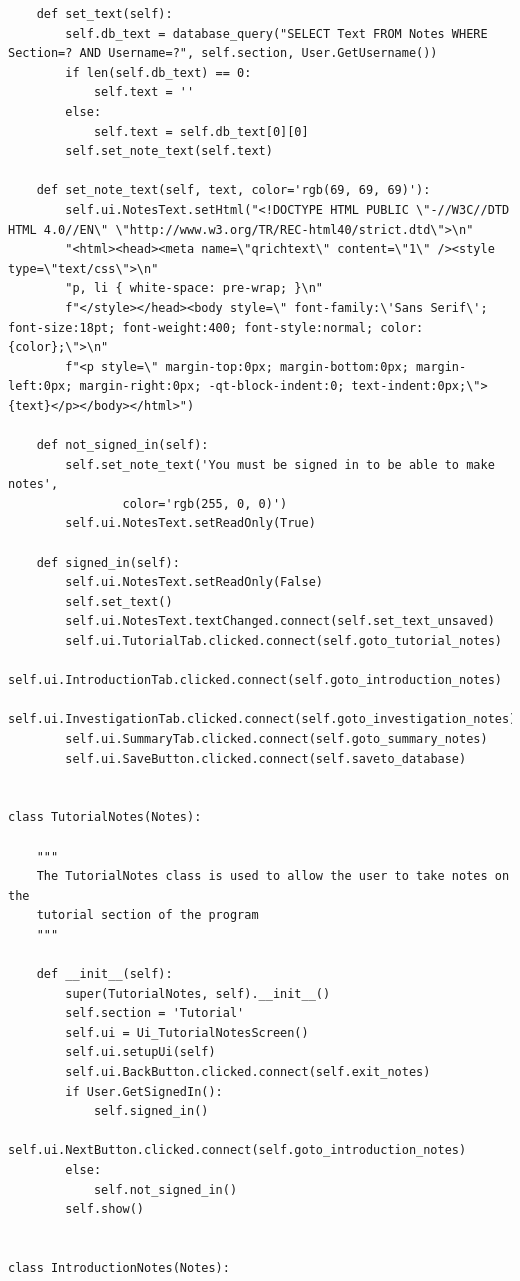 \documentclass{article}
\begin{document}
\begin{lstlisting}
    def set_text(self):
        self.db_text = database_query("SELECT Text FROM Notes WHERE Section=? AND Username=?", self.section, User.GetUsername())
        if len(self.db_text) == 0:
            self.text = ''
        else:
            self.text = self.db_text[0][0]
        self.set_note_text(self.text)

    def set_note_text(self, text, color='rgb(69, 69, 69)'):
        self.ui.NotesText.setHtml("<!DOCTYPE HTML PUBLIC \"-//W3C//DTD HTML 4.0//EN\" \"http://www.w3.org/TR/REC-html40/strict.dtd\">\n"
        "<html><head><meta name=\"qrichtext\" content=\"1\" /><style type=\"text/css\">\n"
        "p, li { white-space: pre-wrap; }\n"
        f"</style></head><body style=\" font-family:\'Sans Serif\'; font-size:18pt; font-weight:400; font-style:normal; color:{color};\">\n"
        f"<p style=\" margin-top:0px; margin-bottom:0px; margin-left:0px; margin-right:0px; -qt-block-indent:0; text-indent:0px;\">{text}</p></body></html>")

    def not_signed_in(self):
        self.set_note_text('You must be signed in to be able to make notes',
                color='rgb(255, 0, 0)')
        self.ui.NotesText.setReadOnly(True)

    def signed_in(self):
        self.ui.NotesText.setReadOnly(False)
        self.set_text()
        self.ui.NotesText.textChanged.connect(self.set_text_unsaved)
        self.ui.TutorialTab.clicked.connect(self.goto_tutorial_notes)
        self.ui.IntroductionTab.clicked.connect(self.goto_introduction_notes)
        self.ui.InvestigationTab.clicked.connect(self.goto_investigation_notes)
        self.ui.SummaryTab.clicked.connect(self.goto_summary_notes)
        self.ui.SaveButton.clicked.connect(self.saveto_database)


class TutorialNotes(Notes):

    """
    The TutorialNotes class is used to allow the user to take notes on the
    tutorial section of the program
    """

    def __init__(self):
        super(TutorialNotes, self).__init__()
        self.section = 'Tutorial'
        self.ui = Ui_TutorialNotesScreen()
        self.ui.setupUi(self)
        self.ui.BackButton.clicked.connect(self.exit_notes)
        if User.GetSignedIn():
            self.signed_in()
            self.ui.NextButton.clicked.connect(self.goto_introduction_notes)
        else:
            self.not_signed_in()
        self.show()


class IntroductionNotes(Notes):


\end{lstlisting}
\end{document}
